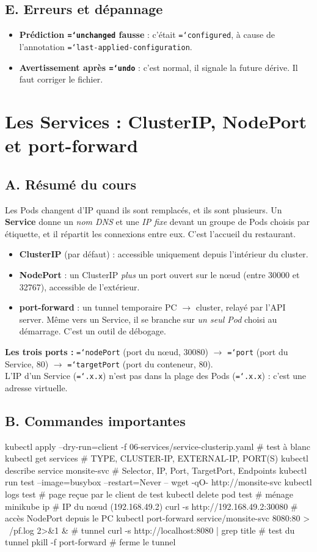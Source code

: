 \documentclass[11pt,a4paper]{article}
\newcommand{\cmd}[1]{\texttt{\hyphenchar\font=`\-#1}}
\newcommand{\partie}[1]{\needspace{9\baselineskip}\subsection*{#1}}
\begin{document}
\partie{E. Erreurs et dépannage}
\begin{itemize}
  \item \textbf{Prédiction \cmd{unchanged} fausse} : c'était \cmd{configured}, à cause de l'annotation \cmd{last-applied-configuration}.
  \item \textbf{Avertissement après \cmd{undo}} : c'est normal, il signale la future dérive. Il faut corriger le fichier.
\end{itemize}

\section{Les Services : ClusterIP, NodePort et port-forward}

\partie{A. Résumé du cours}
Les Pods changent d'IP quand ils sont remplacés, et ils sont plusieurs. Un \textbf{Service} donne un \emph{nom DNS} et une \emph{IP fixe} devant un groupe de Pods choisis par étiquette, et il répartit les connexions entre eux. C'est l'accueil du restaurant.
\begin{itemize}
  \item \textbf{ClusterIP} (par défaut) : accessible uniquement depuis l'intérieur du cluster.
  \item \textbf{NodePort} : un ClusterIP \emph{plus} un port ouvert sur le nœud (entre 30000 et 32767), accessible de l'extérieur.
  \item \textbf{port-forward} : un tunnel temporaire PC $\rightarrow$ cluster, relayé par l'API server. Même vers un Service, il se branche sur \emph{un seul Pod} choisi au démarrage. C'est un outil de débogage.
\end{itemize}
\textbf{Les trois ports :} \cmd{nodePort} (port du nœud, 30080) $\rightarrow$ \cmd{port} (port du Service, 80) $\rightarrow$ \cmd{targetPort} (port du conteneur, 80).\\
L'IP d'un Service (\cmd{10.109.x.x}) n'est pas dans la plage des Pods (\cmd{10.244.x.x}) : c'est une adresse virtuelle.

\partie{B. Commandes importantes}
\begin{code}
kubectl apply --dry-run=client -f 06-services/service-clusterip.yaml  # test à blanc
kubectl get services                     # TYPE, CLUSTER-IP, EXTERNAL-IP, PORT(S)
kubectl describe service monsite-svc     # Selector, IP, Port, TargetPort, Endpoints
kubectl run test --image=busybox --restart=Never -- wget -qO- http://monsite-svc
kubectl logs test                        # page reçue par le client de test
kubectl delete pod test                  # ménage
minikube ip                              # IP du nœud (192.168.49.2)
curl -s http://192.168.49.2:30080        # accès NodePort depuis le PC
kubectl port-forward service/monsite-svc 8080:80 > ~/pf.log 2>&1 &   # tunnel
curl -s http://localhost:8080 | grep title   # test du tunnel
pkill -f port-forward                    # ferme le tunnel
\end{code}
\end{document}
